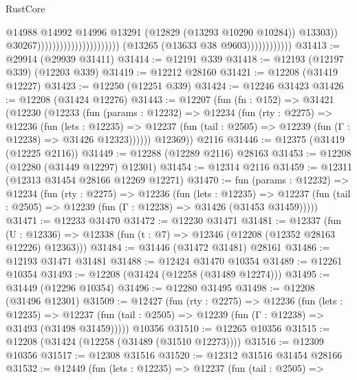 \begin{lexlean}{RustCore}
\begin{coremodule}
                                                                        @14988
                                                                        @14992
                                                                        @14996
                                                                        @13291
                                                                        (@12829
                                                                          (@13293 @10290 @10284))
                                                                        @13303))
                                                                    @30267))))))))))))))))))))))
                        (@13265 (@13633 @38 @9603))))))))))))
@31413 := @29914 (@29939 @31411)
@31414 := @12191 @339
@31418 := @12193 (@12197 @339) (@12203 @339)
@31419 := @12212 @28160
@31421 := @12208 (@31419 @12227)
@31423 := @12250 (@12251 @339)
@31424 := @12246 @31423
@31426 := @12208 (@31424 @12276)
@31443 := @12207
    (fun (fn : @152) =>
    @31421
      (@12230
        (@12233
          (fun (params : @12232) =>
          @12234
            (fun (rty : @2275) =>
            @12236
              (fun (lets : @12235) =>
              @12237 (fun (tail : @2505) => @12239 (fun (Γ : @12238) => @31426 @12323))))))
        @12369))
    @2116
@31446 := @12375 (@31419 (@12225 @2116))
@31449 := @12288 (@12289 @2116) @28163
@31453 := @12208 (@12280 (@31449 @12297) @12301)
@31454 := @12314 @2116
@31459 := @12311 (@12313 @31454 @28166 @12269 @12271)
@31470 := fun (params : @12232) =>
  @12234
    (fun (rty : @2275) =>
    @12236
      (fun (lets : @12235) =>
      @12237 (fun (tail : @2505) => @12239 (fun (Γ : @12238) => @31426 (@31453 @31459)))))
@31471 := @12233 @31470
@31472 := @12230 @31471
@31481 := @12337
    (fun (U : @12336) => @12338 (fun (t : @7) => @12346 (@12208 (@12352 @28163 @12226) @12363)))
@31484 := @31446 (@31472 @31481) @28161
@31486 := @12193 @31471 @31481
@31488 := @12424 @31470 @10354
@31489 := @12261 @10354
@31493 := @12208 (@31424 (@12258 (@31489 @12274)))
@31495 := @31449 (@12296 @10354)
@31496 := @12280 @31495
@31498 := @12208 (@31496 @12301)
@31509 := @12427
    (fun (rty : @2275) =>
    @12236
      (fun (lets : @12235) =>
      @12237 (fun (tail : @2505) => @12239 (fun (Γ : @12238) => @31493 (@31498 @31459)))))
    @10356
@31510 := @12265 @10356
@31515 := @12208 (@31424 (@12258 (@31489 (@31510 @12273))))
@31516 := @12309 @10356
@31517 := @12308 @31516
@31520 := @12312 @31516 @31454 @28166
@31532 := @12449
    (fun (lets : @12235) =>
    @12237
      (fun (tail : @2505) =>

\end{coremodule}
\end{lexlean}
